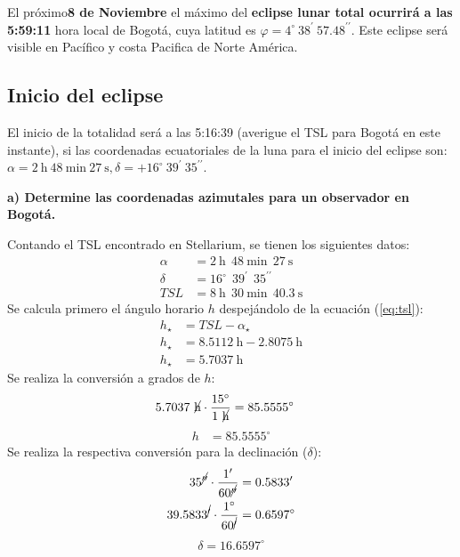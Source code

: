 \begin{multicols}{2}
El próximo\textbf{8 de Noviembre} el máximo del \textbf{eclipse lunar total ocurrirá a las 5:59:11} hora local de Bogotá, cuya latitud es $\varphi = 4^{\circ} ~ 38^{\prime}~ 57.48^{\prime \prime}$. Este eclipse será visible en Pacífico y costa Pacifica de Norte América.
   
\subsection{Inicio del eclipse}
   
El inicio de la totalidad será a las 5:16:39 (averigue el TSL para Bogotá en este instante), si las coordenadas ecuatoriales de la luna para el inicio del eclipse son:
$\alpha = 2~\mathrm{h}~ 48~ \mathrm{min} ~27~ \mathrm{s}, \delta = +16^{\circ}~ 39^{\prime}~ 35^{\prime \prime}$.
   
\textbf{a) Determine las coordenadas azimutales para un observador en Bogotá.}
   
Contando el TSL encontrado en Stellarium, se tienen los siguientes datos:
\begin{align*}
    \alpha &= 2~\mathrm{h}~~ 48~ \mathrm{min}~~ 27~ \mathrm{s} \\
    \delta &= 16^{\circ}~~ 39^{\prime}~~ 35^{\prime \prime}\\
    TSL &= 8~\mathrm{h}~~ 30~\mathrm{min}~~ 40.3~\mathrm{s}
\end{align*}
Se calcula primero el ángulo horario $h$ despejándolo de la ecuación (\ref{eq:tsl}):
\begin{align*}
   h_{\star} &=  TSL - \alpha_{\star} \\
   h_{\star} &=  8.5112~\mathrm{h} - 2.8075~\mathrm{h} \\
   h_{\star} &=  5.7037~\mathrm{h}%
\end{align*}
Se realiza la conversión a grados de $h$:
\begin{align*}
    5.7037~ \cancel{\mathrm{h}} \cdot \frac{15 ^{\circ}}{1~ \cancel{\mathrm{h}}} & =85.5555 ^{\circ} 
\end{align*}
\begin{align}
   h &= 85.5555 ^{\circ} \label{reso:hora}
\end{align}
Se realiza la respectiva conversión para la declinación ($\delta$):
\begin{align*}
   35^{\cancel{\prime \prime}}\cdot \frac{1^{\prime} }{60^{\cancel{\prime \prime}} } &=0.5833^{\prime}\\ 
   39.5833 ^{\cancel{\prime}}\cdot \frac{1 ^{\circ} }{60^{\cancel{\prime}}} &=0.6597^{\circ}
\end{align*}
\begin{align}
    \delta = 16.6597^{\circ} \label{reso:decli}
\end{align}
   

\end{multicols}
